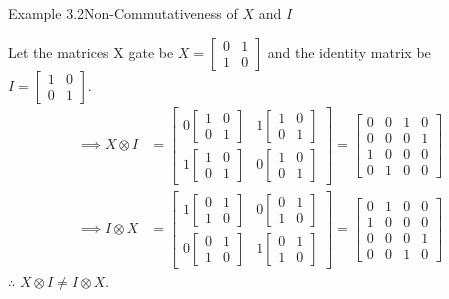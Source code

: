 \documentclass{book}
\begin{document}
\begin{egBox}{Example 3.2}{Non-Commutativeness of $X$ and $I$}
    \raggedright
    Let the matrices X gate be $X = \begin{bmatrix} 0 & 1 \\ 1 & 0 \end{bmatrix}$ and the identity matrix be $I = \begin{bmatrix} 1 & 0 \\ 0 & 1 \end{bmatrix}$.\\
    \begin{align*}
        \implies X \otimes I &= \begin{bmatrix} 0 \begin{bmatrix} 1 & 0 \\ 0 & 1 \end{bmatrix} & 1 \begin{bmatrix} 1 & 0 \\ 0 & 1 \end{bmatrix} \\ 1 \begin{bmatrix} 1 & 0 \\ 0 & 1 \end{bmatrix} & 0 \begin{bmatrix} 1 & 0 \\ 0 & 1 \end{bmatrix} \end{bmatrix} = \begin{bmatrix} 0 & 0 & 1 & 0 \\ 0 & 0 & 0 & 1 \\ 1 & 0 & 0 & 0 \\ 0 & 1 & 0 & 0 \end{bmatrix}\\
        \implies I \otimes X &= \begin{bmatrix} 1 \begin{bmatrix} 0 & 1 \\ 1 & 0 \end{bmatrix} & 0 \begin{bmatrix} 0 & 1 \\ 1 & 0 \end{bmatrix} \\ 0 \begin{bmatrix} 0 & 1 \\ 1 & 0 \end{bmatrix} & 1 \begin{bmatrix} 0 & 1 \\ 1 & 0 \end{bmatrix} \end{bmatrix} = \begin{bmatrix} 0 & 1 & 0 & 0 \\ 1 & 0 & 0 & 0 \\ 0 & 0 & 0 & 1 \\ 0 & 0 & 1 & 0 \end{bmatrix}
    \end{align*}
    $\therefore$ $X \otimes I \neq I \otimes X$.
\end{egBox}
\end{document}
